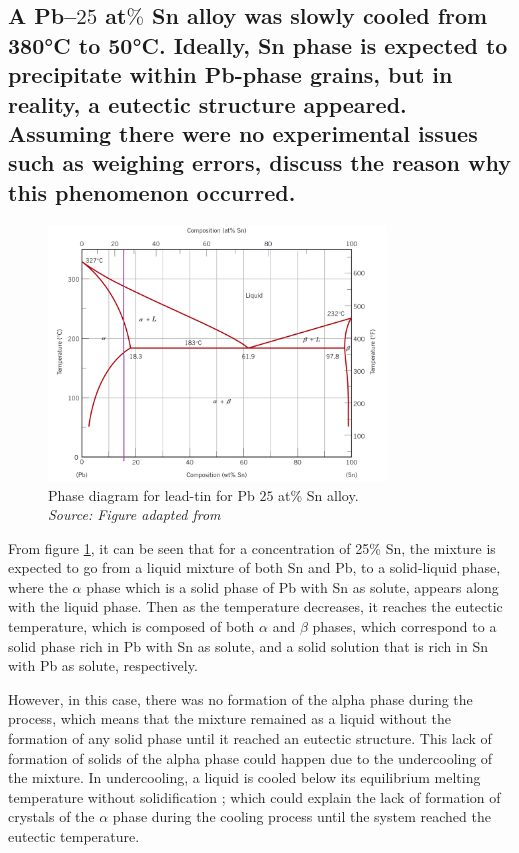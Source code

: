 \subsection{A Pb–$25$ at$\%$ Sn alloy was slowly cooled from 380°C to 50°C. Ideally, Sn phase is expected to precipitate within Pb-phase grains, but in reality, a eutectic structure appeared. Assuming there were no experimental issues such as weighing errors, discuss the reason why this phenomenon occurred.}

\begin{figure}[h]
    \centering
    \includegraphics[width=0.8\textwidth]{graficas/diagrama01.png}
    \caption{Phase diagram for lead-tin for Pb $25$ at\% Sn alloy.\\
    \textit{Source: Figure adapted from \citet[p.~300]{callister2010materials}}}
    \label{fig:diagrama01}
\end{figure}

\newpage
From figure \ref{fig:diagrama01}, it can be seen that for a concentration of 25\% Sn, the mixture is expected to go from a liquid mixture of both Sn and Pb, to a solid-liquid phase, where the $\alpha$ phase which is a solid phase of Pb with Sn as solute, appears along with the liquid phase. Then as the temperature decreases, it reaches the eutectic temperature, which is composed of both $\alpha$ and $\beta$ phases, which correspond to a solid phase rich in Pb with Sn as solute, and a solid solution that is rich in Sn with Pb as solute, respectively. 

However, in this case, there was no formation of the alpha phase during the process, which means that the mixture remained as a liquid without the formation of any solid phase until it reached an eutectic structure. This lack of formation of solids of the alpha phase could happen due to the undercooling of the mixture. In undercooling, a liquid is cooled below its equilibrium melting temperature without solidification \citep[p.~189]{porter2009phase}; which could explain the lack of formation of crystals of the $\alpha$ phase during the cooling process until the system reached the eutectic temperature. 

